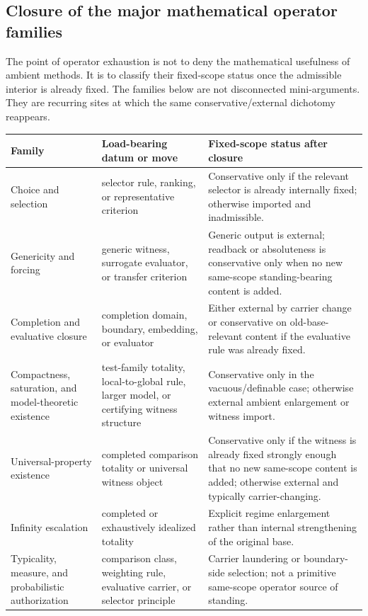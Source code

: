 \subsection{Closure of the major mathematical operator families}

The point of operator exhaustion is not to deny the mathematical usefulness of ambient methods. It is to classify their fixed-scope status once the admissible interior is already fixed. The families below are not disconnected mini-arguments. They are recurring sites at which the same conservative/external dichotomy reappears.

\begin{center}
\renewcommand{\arraystretch}{1.22}
\begin{tabularx}{0.98\textwidth}{P{0.23\textwidth}P{0.31\textwidth}Y}
\toprule
\textbf{Family} & \textbf{Load-bearing datum or move} & \textbf{Fixed-scope status after closure} \\
\midrule
Choice and selection & selector rule, ranking, or representative criterion & Conservative only if the relevant selector is already internally fixed; otherwise imported and inadmissible. \\
Genericity and forcing & generic witness, surrogate evaluator, or transfer criterion & Generic output is external; readback or absoluteness is conservative only when no new same-scope standing-bearing content is added. \\
Completion and evaluative closure & completion domain, boundary, embedding, or evaluator & Either external by carrier change or conservative on old-base-relevant content if the evaluative rule was already fixed. \\
Compactness, saturation, and model-theoretic existence & test-family totality, local-to-global rule, larger model, or certifying witness structure & Conservative only in the vacuous/definable case; otherwise external ambient enlargement or witness import. \\
Universal-property existence & completed comparison totality or universal witness object & Conservative only if the witness is already fixed strongly enough that no new same-scope content is added; otherwise external and typically carrier-changing. \\
Infinity escalation & completed or exhaustively idealized totality & Explicit regime enlargement rather than internal strengthening of the original base. \\
Typicality, measure, and probabilistic authorization & comparison class, weighting rule, evaluative carrier, or selector principle & Carrier laundering or boundary-side selection; not a primitive same-scope operator source of standing. \\

\end{tabularx}
\end{center}

